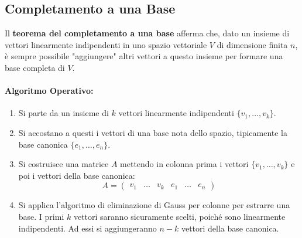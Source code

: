 \documentclass{article}
\begin{document}
\subsection{Completamento a una Base}

Il \textbf{teorema del completamento a una base} afferma che, dato un insieme di vettori linearmente indipendenti in uno spazio vettoriale $V$ di dimensione finita $n$, è sempre possibile "aggiungere" altri vettori a questo insieme per formare una base completa di $V$.

\paragraph{Algoritmo Operativo:}
\begin{enumerate}
    \item Si parte da un insieme di $k$ vettori linearmente indipendenti $\{v_1, \dots, v_k\}$.
    \item Si accostano a questi i vettori di una base nota dello spazio, tipicamente la base canonica $\{e_1, \dots, e_n\}$.
    \item Si costruisce una matrice $A$ mettendo in colonna prima i vettori $\{v_1, \dots, v_k\}$ e poi i vettori della base canonica:
    \[ A = \begin{pmatrix} v_1 & \dots & v_k & e_1 & \dots & e_n \end{pmatrix} \]
    \item Si applica l'algoritmo di eliminazione di Gauss per colonne per estrarre una base. I primi $k$ vettori saranno sicuramente scelti, poiché sono linearmente indipendenti. Ad essi si aggiungeranno $n-k$ vettori della base canonica.
\end{enumerate}
\end{document}
